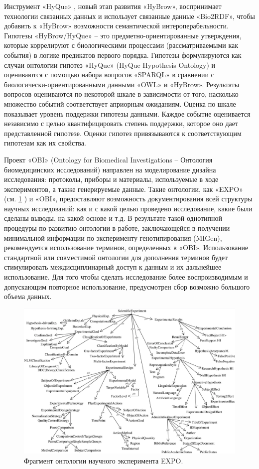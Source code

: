 Инструмент «HyQue» \cite{callahan2011hyque}, новый этап развития «HyBrow», воспринимает технологии связанных данных 
и использует связанные данные «Bio2RDF», чтобы добавить к «HyBrow» возможности семантической интероперабельности. 
Гипотезы «HyBrow/HyQue» – это предметно-ориентированные утверждения, которые коррелируют с биологическими процессами 
(рассматриваемыми как события) в логике предикатов первого порядка. Гипотезы формулируются как случаи онтологии 
гипотез «HyQue» (HyQue Hypothesis Ontology) и оцениваются с помощью набора вопросов «SPARQL» в сравнении с 
биологически-ориентированными данными «OWL» и «HyBrow». Результаты вопросов оцениваются по некоторой шкале в 
зависимости от того, насколько множество событий соответствует априорным ожиданиям. Оценка по шкале показывает 
уровень поддержки гипотезы данными. Каждое событие оценивается независимо с целью квантифицировать степень поддержки, 
которое оно дает представленной гипотезе. Оценки гипотез привязываются к соответствующим гипотезам как их свойства.

Проект «OBI» (Ontology for Biomedical Investigations – Онтология биомедицинских исследований) 
\cite{brinkman2010modeling} направлен на моделирование дизайна исследования: протоколы, приборы и материалы, 
используемые в ходе экспериментов, а также генерируемые данные. Такие онтологии, как «EXPO» 
\cite{soldatova2006ontology} (см. \cref{fig:EXPO} ) и «OBI», предоставляют возможность документирования всей структуры 
научных исследований: как и с какой целью проведено исследование, какие были сделаны выводы, на какой основе и т.д. 
В результате такой однотипной процедуры по развитию онтологии в работе, заключающейся в получении минимальной 
информации по эксперименту генотипирования (MIGen), рекомендуется использование терминов, определенных в «OBI». 
Использование стандартной или совместимой онтологии для дополнения терминов будет стимулировать междисциплинарный 
доступ к данным и их дальнейшее использование. Для того чтобы сделать исследование более воспроизводимым и допускающим 
повторное использование, предусмотрен сбор возможно большого объема данных.

\begin{figure}[ht]
    \centering
    \includegraphics[width=1.0\linewidth]{images/EXPO_onto.png}
    \caption{Фрагмент онтологии научного эксперимента EXPO.}\label{fig:EXPO}
\end{figure}

